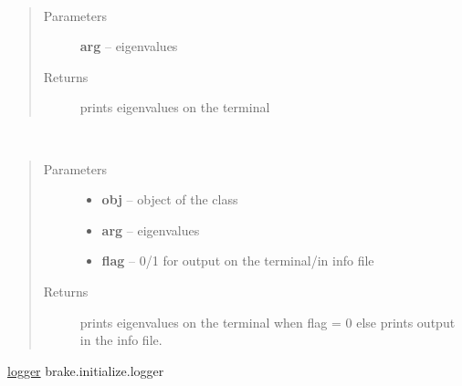 \documentclass[letterpaper,10pt,english]{sphinxmanual}
\begin{document}

\begin{fulllineitems}
\label{index:brake.__init__.print_eigs}~\begin{quote}\begin{description}
\item[{Parameters}] \leavevmode
\textbf{arg} -- eigenvalues

\item[{Returns}] \leavevmode
prints eigenvalues on the terminal

\end{description}\end{quote}

\end{fulllineitems}


\begin{fulllineitems}
\label{index:brake.__init__.print_target_eigs}~\begin{quote}\begin{description}
\item[{Parameters}] \leavevmode\begin{itemize}
\item {} 
\textbf{obj} -- object of the class 

\item {} 
\textbf{arg} -- eigenvalues

\item {} 
\textbf{flag} -- 0/1 for output on the terminal/in info file

\end{itemize}

\item[{Returns}] \leavevmode
prints eigenvalues on the terminal when flag = 0 else prints output in the info file.

\end{description}\end{quote}

\end{fulllineitems}





{\hyperref[index:logger]{logger}}  brake.initialize.logger
\end{document}

